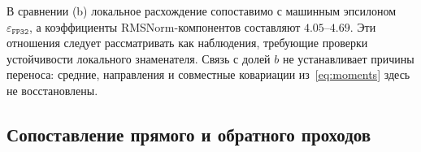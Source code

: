 \begin{table}[!htbp]
    \centering
    \caption{Коэффициент накопления $R_{\text{fwd}}$ по группам компонентов
        ($^\dagger$~для (b) приведены оценки порядка величины:
        расхождение сопоставимо с $\varepsilon_{\texttt{FP32}}$).}
    \label{tab:rfwd}
\end{table}

В сравнении (b) локальное расхождение сопоставимо с машинным эпсилоном
$\varepsilon_{\texttt{FP32}}$, а коэффициенты RMSNorm-компонентов составляют $4.05$--$4.69$.
Эти отношения следует рассматривать как наблюдения, требующие проверки
устойчивости локального знаменателя. Связь с долей $b$ не устанавливает
причины переноса: средние,
направления и совместные ковариации из~\eqref{eq:moments}
здесь не восстановлены.

\subsection{Сопоставление прямого и обратного проходов}

